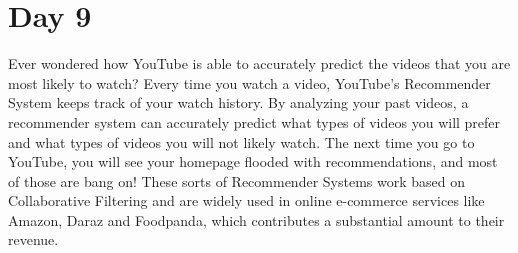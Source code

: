 \documentclass[11pt]{article}
\begin{document}
\section{Day 9}
Ever wondered how YouTube is able to accurately predict the videos that you are most likely to watch? Every time you watch a video, YouTube's Recommender System keeps track of your watch history. By analyzing your past videos, a recommender system can accurately predict what types of videos you will prefer and what types of videos you will not likely watch. The next time you go to YouTube, you will see your homepage flooded with recommendations, and most of those are bang on! These sorts of Recommender Systems work based on Collaborative Filtering and are widely used in online e-commerce services like Amazon, Daraz and Foodpanda, which contributes a substantial amount to their revenue.
\end{document}
